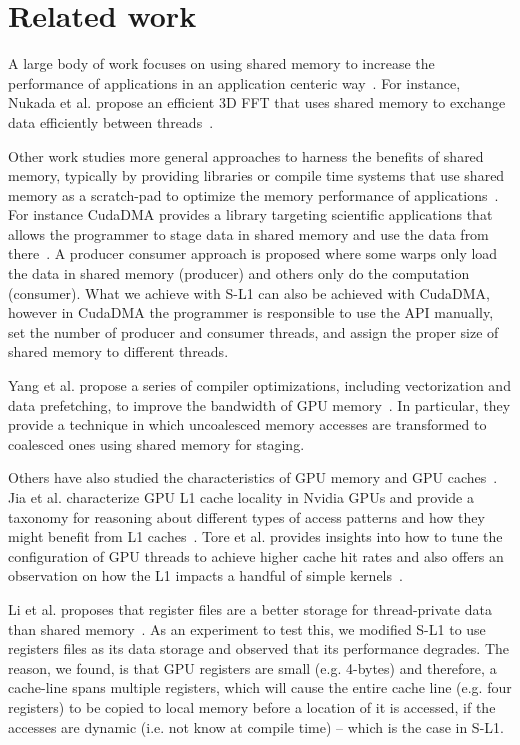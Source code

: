 \section{Related work}
\label{sec:related}

A large body of work focuses on using shared memory to increase the performance of applications in
an application centeric way~\cite{che2009rodinia, tolke2008teraflop, suchard2010understanding, walters2009evaluating,
lin2010accelerating, Khorasanigpu}. For instance, Nukada et al. propose an
efficient 3D FFT that uses shared memory to exchange data efficiently between threads~\cite{fftgpu}.

Other work studies more general approaches to harness the benefits of shared memory, typically by
providing libraries or compile time systems that use shared memory as a scratch-pad to optimize the
memory performance of applications~\cite{Baskaran, YangCompiler, ueng2008cuda, Khangpu, moazeni2009memory,
ji2011using}.
For instance CudaDMA provides a library targeting scientific applications that allows the programmer
to stage data in shared memory and use the data from there~\cite{bauer2011cudadma}. A producer
consumer approach is proposed where some warps only load the data in shared memory (producer)
and others only do the computation (consumer). What we achieve with S-L1 can also be achieved with
CudaDMA, however in CudaDMA the programmer is responsible to use the API manually, set the number of
producer and consumer threads, and assign the proper size of shared memory to different threads.

Yang et al. propose a series of compiler optimizations, including vectorization and data
prefetching, to improve the bandwidth of GPU memory~\cite{YangCompiler}. In particular, they provide
a technique in which uncoalesced memory accesses are transformed to coalesced ones using shared
memory for staging.

Others have also studied the characteristics of GPU memory and GPU
caches~\cite{wongDomestifying, Gaurgpu}. Jia et al.
characterize GPU L1 cache locality in Nvidia GPUs and provide a taxonomy for reasoning about
different types of access patterns and how they might benefit from L1
caches~\cite{jia2012characterizing}.
Tore et al. provides insights into how to tune the configuration of GPU threads to achieve higher
cache hit rates and also offers an observation on how the L1 impacts a handful of simple
kernels~\cite{torres2011understanding}.

Li et al. proposes that register files are a better storage for thread-private
data than shared memory~\cite{ispasswork}. As an experiment to test this, we
modified S-L1 to use registers files as its data storage and observed that its
performance degrades. The reason, we found, is that GPU registers are small
(e.g. 4-bytes) and therefore, a cache-line spans multiple registers, which will
cause the entire cache line (e.g. four registers) to be copied to local memory
before a location of it is accessed, if the accesses are dynamic (i.e. not know
at compile time) -- which is the case in S-L1.


